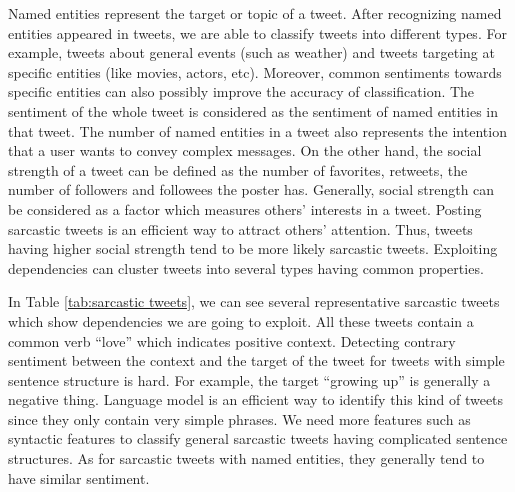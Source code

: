 Named entities represent the target or topic of a tweet. After recognizing named entities appeared in tweets, we are able to classify tweets into different types. For example, tweets about general events (such as weather) and tweets targeting at specific entities (like movies, actors, etc). Moreover, common sentiments towards specific entities can also possibly improve the accuracy of classification. The sentiment of the whole tweet is considered as the sentiment of named entities in that tweet. The number of named entities in a tweet also represents the intention that a user wants to convey complex messages. On the other hand, the social strength of a tweet can be defined as the number of favorites, retweets, the number of followers and followees the poster has. Generally, social strength can be considered as a factor which measures others' interests in a tweet. Posting sarcastic tweets is an efficient way to attract others' attention. Thus, tweets having higher social strength tend to be more likely sarcastic tweets. Exploiting dependencies can cluster tweets into several types having common properties.

In Table \ref{tab:sarcastic tweets}, we can see several representative sarcastic tweets which show dependencies we are going to exploit. All these tweets contain a common verb ``love'' which indicates positive context. Detecting contrary sentiment between the context and the target of the tweet for tweets with simple sentence structure is hard. For example, the target ``growing up'' is generally a negative thing. Language model is an efficient way to identify this kind of tweets since they only contain very simple phrases. We need more features such as syntactic features to classify general sarcastic tweets having complicated sentence structures. As for sarcastic tweets with named entities, they generally tend to have similar sentiment.


